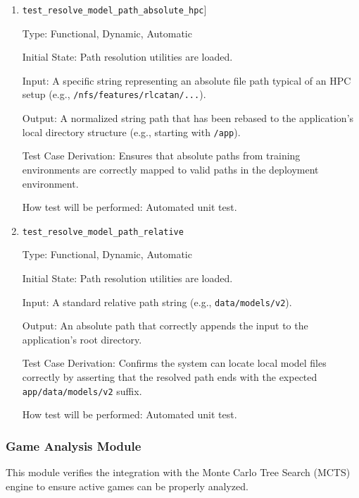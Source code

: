 \documentclass[12pt, titlepage]{article}
\begin{document}
\begin{enumerate}

\item
\texttt{test\_resolve\_model\_path\_absolute\_hpc}]

Type: Functional, Dynamic, Automatic

Initial State: Path resolution utilities are loaded.

Input: A specific string representing an absolute file path typical of an HPC setup (e.g., \texttt{/nfs/features/rlcatan/...}).

Output: A normalized string path that has been rebased to the application's local directory structure (e.g., starting with \texttt{/app}).

Test Case Derivation: Ensures that absolute paths from training environments are correctly mapped to valid paths in the deployment environment.

How test will be performed: Automated unit test.

\item
\texttt{test\_resolve\_model\_path\_relative}

Type: Functional, Dynamic, Automatic

Initial State: Path resolution utilities are loaded.

Input: A standard relative path string (e.g., \texttt{data/models/v2}).

Output: An absolute path that correctly appends the input to the application's root directory.

Test Case Derivation: Confirms the system can locate local model files correctly by asserting that the resolved path ends with the expected \texttt{app/data/models/v2} suffix.

How test will be performed: Automated unit test.

\end{enumerate}

\subsubsection{Game Analysis Module}

This module verifies the integration with the Monte Carlo Tree Search (MCTS) engine to ensure active games can be properly analyzed.
\end{document}
